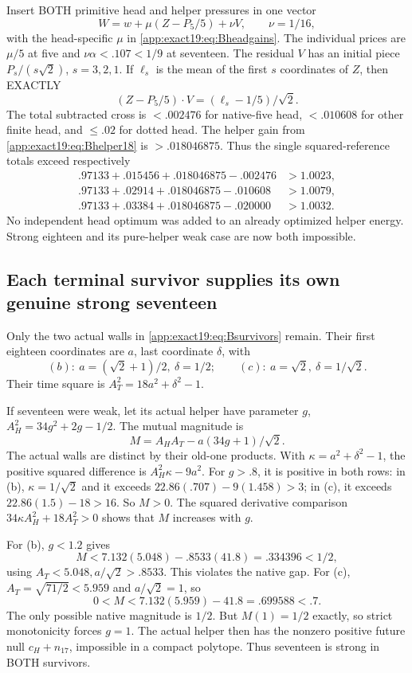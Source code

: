 Insert BOTH primitive head and
helper pressures in one vector
\[
                   W=w+\mu(Z-P_5/5)+\nu V,\qquad\nu=1/16 ,
\]
with the head-specific \(\mu\)
in \eqref{app:exact19:eq:Bheadgains}.
The individual prices are
\(\mu/5\) at five and
\(\nu\alpha<.107<1/9\) at seventeen.
The residual \(V\) has an initial
piece \(P_s/(s\sqrt2)\),
\(s=3,2,1\).
If \(\ell_s\) is the mean of the
first \(s\) coordinates of \(Z\),
then EXACTLY
\[
                         (Z-P_5/5)\cdot V=(\ell_s-1/5)/\sqrt2 .
\]
The total subtracted cross is
\(<.002476\) for native-five head,
\(<.010608\) for other finite head,
and \(\le.02\) for dotted head.
The helper gain from
\eqref{app:exact19:eq:Bhelper18}
is \(>.018046875\).
Thus the single squared-reference
totals exceed respectively
\[
\begin{split}
 .97133+.015456+.018046875-.002476&>1.0023,\\
 .97133+.02914+.018046875-.010608&>1.0079,\\
 .97133+.03384+.018046875-.020000&>1.0032 .
\end{split}
\]
No independent head optimum was
added to an already optimized
helper energy.
Strong eighteen and its pure-helper
weak case are now both impossible.

\subsection{Each terminal survivor supplies its own genuine strong seventeen}
\label{app:exact19:Bsurvivorhead}

Only the two actual walls in
\eqref{app:exact19:eq:Bsurvivors}
remain.
Their first eighteen coordinates
are \(a\), last coordinate
\(\delta\), with
\[
       (b):\ a=(\sqrt2+1)/2,\ \delta=1/2;\qquad
       (c):\ a=\sqrt2,\ \delta=1/\sqrt2 .
\]
Their time square is
\(A_T^2=18a^2+\delta^2-1\).

If seventeen were weak, let its
actual helper have parameter \(g\),
\(A_H^2=34g^2+2g-1/2\).
The mutual magnitude is
\[
                  M=A_HA_T-a(34g+1)/\sqrt2 .
\]
The actual walls are distinct by
their old-one products.
With \(\kappa=a^2+\delta^2-1\),
the positive squared difference
is \(A_H^2\kappa-9a^2\).
For \(g>.8\), it is positive in
both rows: in (b), \(\kappa=1/\sqrt2\)
and it exceeds
\(22.86(.707)-9(1.458)>3\);
in (c), it exceeds
\(22.86(1.5)-18>16\).
So \(M>0\).
The squared derivative comparison
\(34\kappa A_H^2+18A_T^2>0\)
shows that \(M\) increases with \(g\).

For (b), \(g<1.2\) gives
\[
                M<7.132(5.048)-.8533(41.8)
                           =.334396<1/2 ,
\]
using \(A_T<5.048,a/\sqrt2>.8533\).
This violates the native gap.
For (c), \(A_T=\sqrt{71/2}<5.959\)
and \(a/\sqrt2=1\), so
\[
                        0<M<7.132(5.959)-41.8=.699588<.7 .
\]
The only possible native magnitude
is \(1/2\).
But \(M(1)=1/2\) exactly, so strict
monotonicity forces \(g=1\).
The actual helper then has the
nonzero positive future null
\(c_H+n_{17}\), impossible in a
compact polytope.
Thus seventeen is strong in BOTH
survivors.

